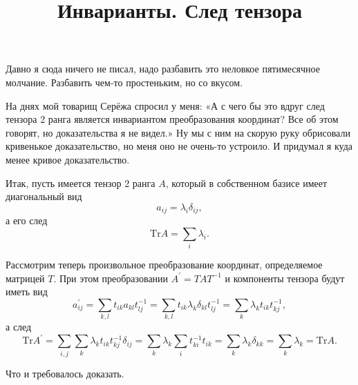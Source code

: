 

\title{Инварианты. След тензора}


\maketitle

Давно я сюда ничего не писал, надо разбавить это неловкое пятимесячное молчание. Разбавить чем-то простеньким, но со вкусом.

На днях мой товарищ Серёжа спросил у меня: «А с чего бы это вдруг след тензора 2 ранга является инвариантом преобразования координат? Все об этом говорят, но доказательства я не видел.» Ну мы с ним на скорую руку обрисовали кривенькое доказательство, но меня оно не очень-то устроило. И придумал я куда менее кривое доказательство.

Итак, пусть имеется тензор 2 ранга \( A \), который в собственном базисе имеет диагональный вид
\[
    a_{ij} = \lambda_i\delta_{ij},
\]
а его след
\[
    \mathrm{Tr} A = \sum_i\lambda_i.
\]

Рассмотрим теперь произвольное преобразование координат, определяемое матрицей \( T \). При этом преобразовании \( A^\prime = TAT^{-1} \) и компоненты тензора будут иметь вид
\[
    a^\prime_{ij} = \sum_{k,l} t_{ik}a_{kl}t^{-1}_{lj} = \sum_{k,l} t_{ik}\lambda_k\delta_{kl}t^{-1}_{lj} = \sum_{k} \lambda_kt_{ik}t^{-1}_{kj},
\]
а след
\[
    \mathrm{Tr} A^\prime = \sum_{i,j}\sum_k \lambda_kt_{ik}t^{-1}_{kj}\delta_{ij} = \sum_k \lambda_k \sum_i t^{-1}_{ki} t_{ik} =\sum_k \lambda_k \delta_{kk} = \sum_k \lambda_k = \mathrm{Tr} A.
\]

Что и требовалось доказать.
